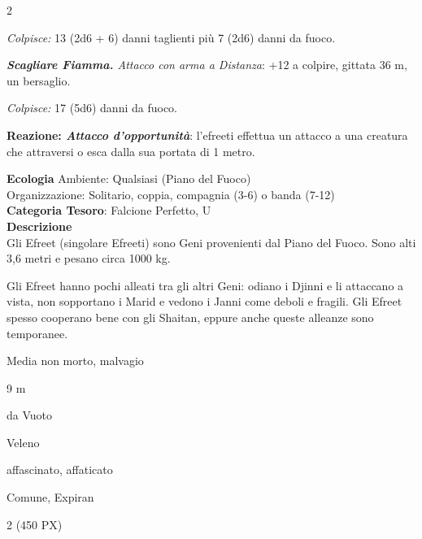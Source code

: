 \begin{multicols}{2}
{\emph{Colpisce:} 13 (2d6 + 6) danni taglienti più 7 (2d6) danni da fuoco.

\emph{\textbf{Scagliare Fiamma.} Attacco con arma a Distanza}: +12 a colpire, gittata 36 m, un bersaglio.

\emph{Colpisce:} 17 (5d6) danni da fuoco.

\textbf{Reazione: \emph{Attacco d'opportunità}}: l'efreeti effettua un attacco a una creatura che attraversi o esca dalla sua portata di 1 metro.

\textbf{Ecologia}
Ambiente: Qualsiasi (Piano del Fuoco)\\
Organizzazione: Solitario, coppia, compagnia (3-6) o banda (7-12)\\
\textbf{Categoria Tesoro}: Falcione Perfetto, U\\
\textbf{Descrizione}\\
Gli Efreet (singolare Efreeti) sono Geni provenienti dal Piano del Fuoco. Sono alti 3,6 metri e pesano circa 1000 kg.

Gli Efreet hanno pochi alleati tra gli altri Geni: odiano i Djinni e li attaccano a vista, non sopportano i Marid e vedono i Janni come deboli e fragili. Gli Efreet spesso cooperano bene con gli Shaitan, eppure anche queste alleanze sono temporanee.

\begin{description}[noitemsep, topsep=0pt, parsep=0pt, partopsep=0pt, itemsep=1pt, leftmargin=2.35cm,  labelwidth=2.2cm, itemindent=0cm, listparindent=0pt] %
\setlength{\baselineskip}{10pt}
\item[\textbf{Taglia/Tipo}] Media non morto, malvagio
\item[\textbf{Caratt.}] 
\item[\textbf{Punti Ferita}] 
\item[\textbf{Movimento}] 9 m
\item[\textbf{Tiri Salvez.}] 
\item[\textbf{Res. Danni}] da Vuoto
\item[\textbf{Imm. Danni}] Veleno
\item[\textbf{Immunità}] affascinato, affaticato
\item[\textbf{Sensi}] 
\item[\textbf{Linguaggi}] Comune, Expiran
\item[\textbf{Sfida}] 2 (450 PX)
\end{description}
\smallskip

}
\end{multicols}
